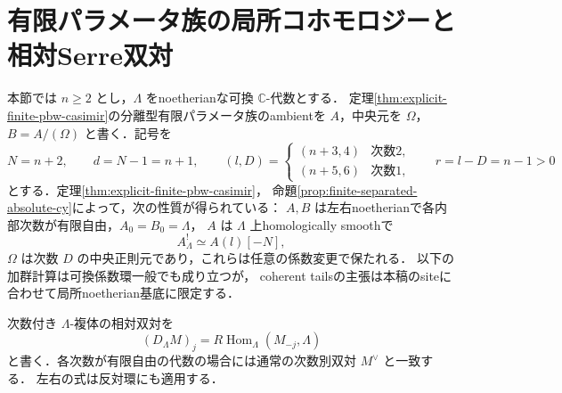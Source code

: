 \section{有限パラメータ族の局所コホモロジーと相対Serre双対}
\label{sec:finite-tails}

本節では $n\ge2$ とし，$\Lambda$ をnoetherianな可換 $\mathbb C$-代数とする．
定理\ref{thm:explicit-finite-pbw-casimir}の分離型有限パラメータ族のambientを $A$，中央元を $\Omega$，
$B=A/(\Omega)$ と書く．記号を
\[
 N=n+2,\qquad d=N-1=n+1,\qquad
 (l,D)=\begin{cases}(n+3,4)&\text{次数2},\\(n+5,6)&\text{次数1},\end{cases}
 \qquad r=l-D=n-1>0
\]
とする．定理\ref{thm:explicit-finite-pbw-casimir}，
命題\ref{prop:finite-separated-absolute-cy}によって，次の性質が得られている：
$A,B$ は左右noetherianで各内部次数が有限自由，$A_0=B_0=\Lambda$，
$A$ は $\Lambda$ 上homologically smoothで
\[
 A^!_\Lambda\simeq A(l)[-N],
\]
$\Omega$ は次数 $D$ の中央正則元であり，これらは任意の係数変更で保たれる．
以下の加群計算は可換係数環一般でも成り立つが，
coherent tailsの主張は本稿のsiteに合わせて局所noetherian基底に限定する．

次数付き $\Lambda$-複体の相対双対を
\[
 (D_\Lambda M)_j=R\!\operatorname{Hom}_\Lambda(M_{-j},\Lambda)
\]
と書く．各次数が有限自由の代数の場合には通常の次数別双対 $M^\vee$ と一致する．
左右の式は反対環にも適用する．

